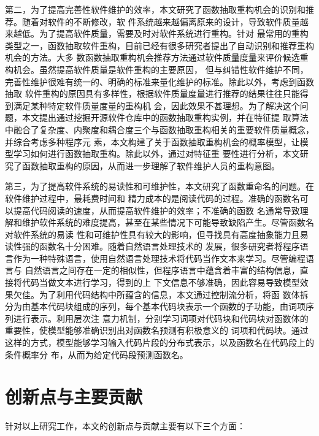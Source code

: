 第二，为了提高完善性软件维护的效率，本文研究了函数抽取重构机会的识别和推荐。随着对软件的不断修改，软
件系统越来越偏离原来的设计，导致软件质量越来越低。为了提高软件质量，需要及时对软件系统进行重构。针对
最常用的重构类型之一，函数抽取软件重构，目前已经有很多研究者提出了自动识别和推荐重构机会的方法。大多
数函数抽取重构机会推荐方法通过软件质量度量来评价候选重构机会。虽然提高软件质量是软件重构的主要原因，
但与纠错性软件维护不同，完善性维护很难有统一的、明确的标准来量化维护的标准。除此以外，考虑到函数抽取
软件重构的原因具有多样性，根据软件质量度量进行推荐的结果往往只能得到满足某种特定软件质量度量的重构机
会，因此效果不甚理想。为了解决这个问题，本文提出通过挖掘开源软件仓库中的函数抽取重构实例，并在特征提
取算法中融合了复杂度、内聚度和耦合度三个与函数抽取重构相关的重要软件质量概念，并综合考虑多种程序元
素，本文构建了关于函数抽取重构机会的概率模型，让模型学习如何进行函数抽取重构。除此以外，通过对特征重
要性进行分析，本文研究了函数抽取重构的原因，从而进一步理解了软件维护人员的重构意图。

第三，为了提高软件系统的易读性和可维护性，本文研究了函数重命名的问题。在软件维护过程中，最耗费时间和
精力成本的是阅读代码的过程。准确的函数名可以提高代码阅读的速度，从而提高软件维护的效率；不准确的函数
名通常导致理解和维护软件系统的难度提高，甚至在某些情况下可能导致缺陷产生。尽管函数名对软件系统的易读
性和可维护性具有较大的影响，但寻找具有高度抽象能力且易读性强的函数名十分困难。随着自然语言处理技术的
发展，很多研究者将程序语言作为一种特殊语言，使用自然语言处理技术将代码当作文本来学习。尽管编程语言与
自然语言之间存在一定的相似性，但程序语言中蕴含着丰富的结构信息，直接将代码当做文本进行学习，得到的上
下文信息不够准确，因此容易导致模型效果欠佳。为了利用代码结构中所蕴含的信息，本文通过控制流分析，将函
数体拆分为由基本代码块组成的序列，每个基本代码块表示一个函数的子功能，由词项序列进行表示。利用层次注
意力机制，分别学习词项对代码块和代码块对函数体的重要性，使模型能够准确识别出对函数名预测有积极意义的
词项和代码块。通过这样的方式，模型能够学习输入代码片段的分布式表示，以及函数名在代码段上的条件概率分
布，从而为给定代码段预测函数名。

\section{创新点与主要贡献}
针对以上研究工作，本文的创新点与贡献主要有以下三个方面：


